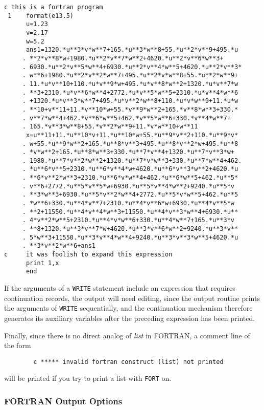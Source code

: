 {\small
\begin{verbatim}
c this is a fortran program
 1    format(e13.5)
      u=1.23
      v=2.17
      w=5.2
      ans1=1320.*u**3*v*w**7+165.*u**3*w**8+55.*u**2*v**9+495.*u
     . **2*v**8*w+1980.*u**2*v**7*w**2+4620.*u**2*v**6*w**3+
     . 6930.*u**2*v**5*w**4+6930.*u**2*v**4*w**5+4620.*u**2*v**3*
     . w**6+1980.*u**2*v**2*w**7+495.*u**2*v*w**8+55.*u**2*w**9+
     . 11.*u*v**10+110.*u*v**9*w+495.*u*v**8*w**2+1320.*u*v**7*w
     . **3+2310.*u*v**6*w**4+2772.*u*v**5*w**5+2310.*u*v**4*w**6
     . +1320.*u*v**3*w**7+495.*u*v**2*w**8+110.*u*v*w**9+11.*u*w
     . **10+v**11+11.*v**10*w+55.*v**9*w**2+165.*v**8*w**3+330.*
     . v**7*w**4+462.*v**6*w**5+462.*v**5*w**6+330.*v**4*w**7+
     . 165.*v**3*w**8+55.*v**2*w**9+11.*v*w**10+w**11
      x=u**11+11.*u**10*v+11.*u**10*w+55.*u**9*v**2+110.*u**9*v*
     . w+55.*u**9*w**2+165.*u**8*v**3+495.*u**8*v**2*w+495.*u**8
     . *v*w**2+165.*u**8*w**3+330.*u**7*v**4+1320.*u**7*v**3*w+
     . 1980.*u**7*v**2*w**2+1320.*u**7*v*w**3+330.*u**7*w**4+462.
     . *u**6*v**5+2310.*u**6*v**4*w+4620.*u**6*v**3*w**2+4620.*u
     . **6*v**2*w**3+2310.*u**6*v*w**4+462.*u**6*w**5+462.*u**5*
     . v**6+2772.*u**5*v**5*w+6930.*u**5*v**4*w**2+9240.*u**5*v
     . **3*w**3+6930.*u**5*v**2*w**4+2772.*u**5*v*w**5+462.*u**5
     . *w**6+330.*u**4*v**7+2310.*u**4*v**6*w+6930.*u**4*v**5*w
     . **2+11550.*u**4*v**4*w**3+11550.*u**4*v**3*w**4+6930.*u**
     . 4*v**2*w**5+2310.*u**4*v*w**6+330.*u**4*w**7+165.*u**3*v
     . **8+1320.*u**3*v**7*w+4620.*u**3*v**6*w**2+9240.*u**3*v**
     . 5*w**3+11550.*u**3*v**4*w**4+9240.*u**3*v**3*w**5+4620.*u
     . **3*v**2*w**6+ans1
c     it was foolish to expand this expression
      print 1,x
      end
\end{verbatim}
}
If the arguments of a {\tt WRITE} statement include an expression that
requires continuation records, the output will need editing, since the
output routine prints the arguments of {\tt WRITE} sequentially, and the
continuation mechanism therefore generates its auxiliary variables after
the preceding expression has been printed.

Finally, since there is no direct analog of {\em list\/} in FORTRAN,
a comment line of the form
\begin{verbatim}
        c ***** invalid fortran construct (list) not printed
\end{verbatim}
will be printed if you try to print a list with {\tt FORT} on.

\subsubsection{{FORTRAN} Output Options}

